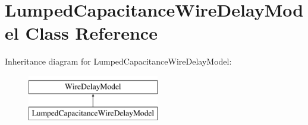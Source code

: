 \hypertarget{classLumpedCapacitanceWireDelayModel}{\section{Lumped\-Capacitance\-Wire\-Delay\-Model Class Reference}
\label{classLumpedCapacitanceWireDelayModel}
}
Inheritance diagram for Lumped\-Capacitance\-Wire\-Delay\-Model\-:\begin{figure}[H]
\begin{center}
\leavevmode
\includegraphics[height=2.000000cm]{classLumpedCapacitanceWireDelayModel}
\end{center}
\end{figure}
